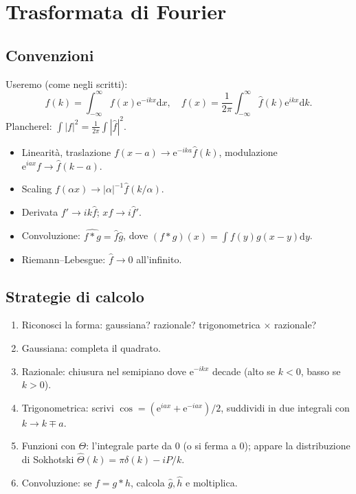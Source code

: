 \documentclass[11pt,a4paper,openany]{book}
\theoremstyle{definition}
\newcommand{\dd}{\mathrm{d}}
\newcommand{\eu}{\mathrm{e}}
\begin{document}
\chapter{Trasformata di Fourier}

\section{Convenzioni}
Useremo (come negli scritti):
$$\hat f(k)=\int_{-\infty}^\infty f(x)\eu^{-ikx}\dd x,\quad f(x)=\frac{1}{2\pi}\int_{-\infty}^\infty\hat f(k)\eu^{ikx}\dd k.$$
Plancherel: $\int|f|^2=\frac{1}{2\pi}\int|\hat f|^2$.

\begin{teoria}[Propriet\`a]
\begin{itemize}
\item Linearit\`a, traslazione $f(x-a)\to\eu^{-ika}\hat f(k)$, modulazione $\eu^{iax}f\to\hat f(k-a)$.
\item Scaling $f(\alpha x)\to|\alpha|^{-1}\hat f(k/\alpha)$.
\item Derivata $f'\to ik\hat f$; $xf\to i\hat f'$.
\item Convoluzione: $\widehat{f*g}=\hat f\hat g$, dove $(f*g)(x)=\int f(y)g(x-y)\dd y$.
\item Riemann--Lebesgue: $\hat f\to 0$ all'infinito.
\end{itemize}
\end{teoria}

\section{Strategie di calcolo}

\begin{algoritmo}
\begin{enumerate}
\item Riconosci la forma: gaussiana? razionale? trigonometrica $\times$ razionale?
\item Gaussiana: completa il quadrato.
\item Razionale: chiusura nel semipiano dove $\eu^{-ikx}$ decade (alto se $k<0$, basso se $k>0$).
\item Trigonometrica: scrivi $\cos=(\eu^{ia x}+\eu^{-iax})/2$, suddividi in due integrali con $k\to k\mp a$.
\item Funzioni con $\Theta$: l'integrale parte da $0$ (o si ferma a $0$); appare la distribuzione di Sokhotski $\hat\Theta(k)=\pi\delta(k)-iP/k$.
\item Convoluzione: se $f=g*h$, calcola $\hat g,\hat h$ e moltiplica.
\end{enumerate}
\end{algoritmo}
\end{document}

